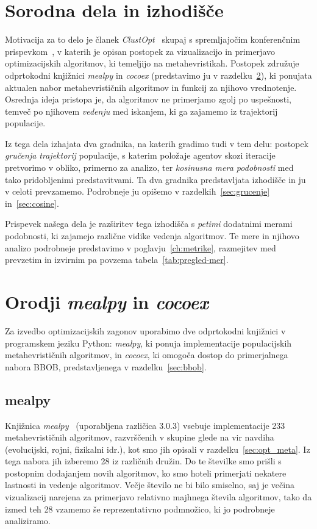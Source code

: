 \documentclass[a4paper, 12pt]{book}
\begin{document}
\section{Sorodna dela in izhodišče}
\label{sec:sorodna}

Motivacija za to delo je članek \emph{ClustOpt}~\cite{clustopt2025} skupaj s
spremljajočim konferenčnim prispevkom~\cite{cenikj2025searchbehavior}, v
katerih je opisan postopek za vizualizacijo in primerjavo optimizacijskih
algoritmov, ki temeljijo na metahevristikah. Postopek združuje odprtokodni knjižnici
\emph{mealpy} in \emph{cocoex} (predstavimo ju v razdelku~\ref{sec:mc}), ki
ponujata aktualen nabor metahevrističnih algoritmov in funkcij za njihovo
vrednotenje. Osrednja ideja pristopa je, da algoritmov ne primerjamo zgolj po
uspešnosti, temveč po njihovem \emph{vedenju} med iskanjem, ki ga zajamemo iz
trajektorij populacije.

Iz tega dela izhajata dva gradnika, na katerih gradimo tudi v tem delu:
postopek \emph{gručenja trajektorij} populacije, s katerim položaje agentov
skozi iteracije pretvorimo v obliko, primerno za analizo, ter \emph{kosinusna
mera podobnosti} med tako pridobljenimi predstavitvami. Ta dva gradnika
predstavljata izhodišče in ju v celoti prevzamemo. Podrobneje ju opišemo v
razdelkih~\ref{sec:grucenje} in~\ref{sec:cosine}.

Prispevek našega dela je razširitev tega izhodišča s \emph{petimi} dodatnimi
merami podobnosti, ki zajamejo različne vidike vedenja algoritmov. Te mere in
njihovo analizo podrobneje predstavimo v poglavju~\ref{ch:metrike},
razmejitev med prevzetim in izvirnim pa povzema
tabela~\ref{tab:pregled-mer}.

\section{Orodji \emph{mealpy} in \emph{cocoex}}
\label{sec:mc}

Za izvedbo optimizacijskih zagonov uporabimo dve odprtokodni knjižnici v
programskem jeziku Python: \emph{mealpy}, ki ponuja implementacije populacijskih
metahevrističnih algoritmov, in \emph{cocoex}, ki omogoča dostop do
primerjalnega nabora BBOB, predstavljenega v razdelku~\ref{sec:bbob}.

\subsection{mealpy}

Knjižnica \emph{mealpy}~\cite{van2023mealpy} (uporabljena različica 3.0.3)
vsebuje implementacije 233 metahevrističnih algoritmov, razvrščenih v
skupine glede na vir navdiha (evolucijski, rojni, fizikalni idr.), kot smo jih
opisali v razdelku~\ref{sec:opt_meta}. Iz tega nabora jih izberemo 28 iz različnih družin. Do te številke smo prišli s postopnim dodajanjem novih algoritmov, ko smo hoteli primerjati nekatere lastnosti in vedenje algoritmov. Večje število ne bi bilo smiselno, saj je večina vi\-zu\-ali\-za\-cij narejena za primerjavo relativno majhnega števila algoritmov, tako da izmed teh 28 vzamemo še reprezentativno podmnožico, ki jo podrobneje analiziramo. 
\end{document}
